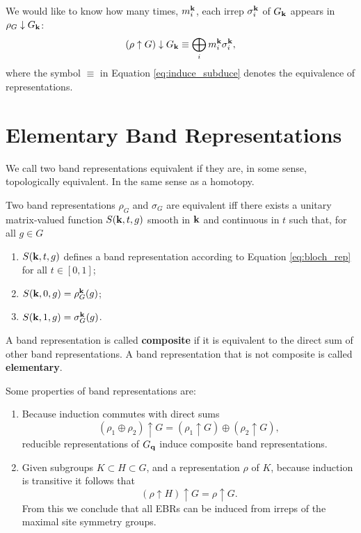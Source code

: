 \n

We would like to know how many times, $m_i^{\vb{k}}$, each irrep $\sigma_i^{\vb{k}}$ of $G_{\vb{k}}$ appears in $\rho_G \downarrow G_{\vb{k}}$:
\begin{equation} \label{eq:induce_subduce}
(\rho \uparrow G) \downarrow G_{\vb{k}} \equiv \bigoplus_i m_i^{\vb{k}} \sigma_i^{\vb{k}},
\end{equation}
where the symbol $\equiv$ in Equation \ref{eq:induce_subduce} denotes the equivalence of representations.

\section{Elementary Band Representations}

We call two band representations equivalent if they are, in some sense, topologically equivalent. In the same sense as a homotopy.

\begin{definition} \label{def:equiv_bandrep}
Two band representations $\rho_G$ and $\sigma_G$ are equivalent iff there exists a unitary matrix-valued function $S({\vb{k}},t,g)$ smooth in ${\vb{k}}$ and continuous in $t$ such that, for all $g \in G$
\begin{enumerate}
\item $S({\vb{k}}, t, g)$ defines a band representation according to Equation \ref{eq:bloch_rep} for all $t \in [0,1]$;
\item $S({\vb{k}}, 0, g) = \rho_G^{\vb{k}}(g)$;
\item $S({\vb{k}}, 1, g) = \sigma_G^{\vb{k}}(g)$.
\end{enumerate}
\end{definition}

\begin{definition}
A band representation is called \textbf{composite} if it is equivalent to the direct sum of other band representations. A band representation that is not composite is called \textbf{elementary}.
\end{definition}

\begin{theorem}
Some properties of band representations are:
\begin{enumerate}
\item Because induction commutes with direct sums
$$
(\rho_1 \oplus \rho_2) \uparrow G = (\rho_1 \uparrow G) \oplus (\rho_2 \uparrow G),
$$
reducible representations of $G_{\vb{q}}$ induce composite band representations.

\item Given subgroups $K \subset H \subset G$, and a representation $\rho$ of $K$, because induction is transitive it follows that
$$
(\rho \uparrow H) \uparrow G = \rho \uparrow G.
$$
From this we conclude that all EBRs can be induced from irreps of the maximal site symmetry groups.
\end{enumerate}
\end{theorem}

